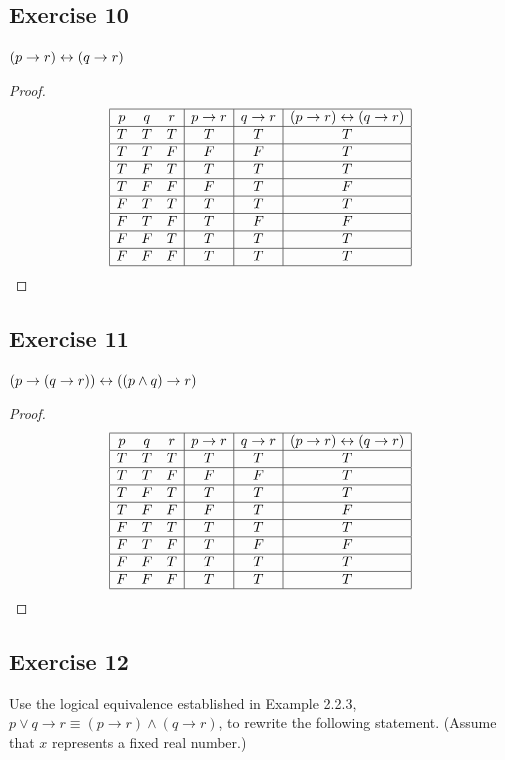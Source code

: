 \documentclass[14pt]{extarticle}
\begin{document}
\subsection{Exercise 10} $(p \to r) \leftrightarrow (q \to r)$
\begin{proof} $$ \begin{array}{|ccc|c|c|c|} \hline p & q & r & p \to r & q \to r
& (p \to r) \leftrightarrow (q \to r) \\ \hline T & T & T & T & T & T \\ \hline T & T & F &
F & F & T \\ \hline T & F & T & T & T & T \\ \hline T & F & F & F & T & F \\
\hline F & T & T & T & T & T \\ \hline F & T & F & T & F & F \\ \hline F & F & T
& T & T & T \\ \hline F & F & F & T & T & T \\ \hline \end{array} $$ \end{proof}

\subsection{Exercise 11} $(p \to (q \to r)) \leftrightarrow ((p \wedge q) \to r)$
\begin{proof} $$ \begin{array}{|ccc|c|c|c|} \hline p & q & r & p \to r & q \to r
& (p \to r) \leftrightarrow (q \to r) \\ \hline T & T & T & T & T & T \\ \hline T & T & F &
F & F & T \\ \hline T & F & T & T & T & T \\ \hline T & F & F & F & T & F \\
\hline F & T & T & T & T & T \\ \hline F & T & F & T & F & F \\ \hline F & F & T
& T & T & T \\ \hline F & F & F & T & T & T \\ \hline \end{array} $$ \end{proof}

\subsection{Exercise 12} Use the logical equivalence established in Example
2.2.3, $p \vee q \to r \equiv (p \to r) \wedge (q \to r)$, to rewrite the
following statement. (Assume that $x$ represents a fixed real number.)
\end{document}
